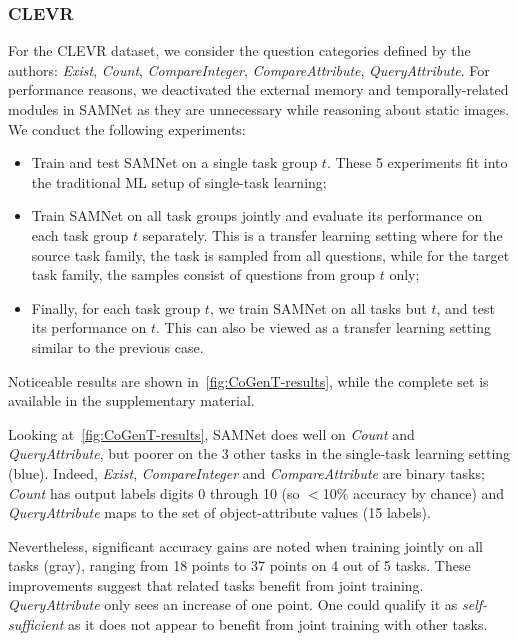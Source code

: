 \subsubsection{CLEVR}
\label{sec:reasoning-clevr}
For the CLEVR dataset, we consider the question categories defined by the authors: \textit{Exist}, \textit{Count}, \textit{CompareInteger}, \textit{CompareAttribute}, \textit{QueryAttribute}. For performance reasons, we deactivated the external memory and temporally-related modules in SAMNet as they are unnecessary while reasoning about static images. We conduct the following experiments:
\begin{itemize}
	\compresslist
	\item Train and test SAMNet on a single task group $t$. These 5 experiments fit into the traditional ML setup of single-task learning;
	\item Train SAMNet on all task groups jointly and evaluate its performance on each task group $t$ separately.
	This is a transfer learning setting where for the source task family, the task is sampled from all questions,
	while for the target task family, the samples consist of questions from group $t$ only;
	\item Finally, for each task group $t$, we train SAMNet on all tasks but $t$, and test its performance on $t$.
	This can also be viewed as a transfer learning setting similar to the previous case.
\end{itemize}

Noticeable results are shown in~\cref{fig:CoGenT-results}, while the complete set is available in the supplementary material.%


Looking at~\cref{fig:CoGenT-results}, SAMNet does well on \textit{Count} and \textit{QueryAttribute}, but poorer on the 3 other tasks in the single-task learning setting (blue). Indeed, \textit{Exist}, \textit{CompareInteger} and \textit{CompareAttribute} are binary tasks; \textit{Count} has output labels digits 0 through 10 (so $<$10\% accuracy by chance) and \textit{QueryAttribute} maps to the set of object-attribute values (15 labels).

Nevertheless, significant accuracy gains are noted when training jointly on all tasks (gray), ranging from 18 points to 37 points on 4 out of 5 tasks. These improvements suggest that related tasks benefit from joint training. \textit{QueryAttribute} only sees an increase of one point. One could qualify it as \textit{self-sufficient} as it does not appear to benefit from joint training with other tasks. 

